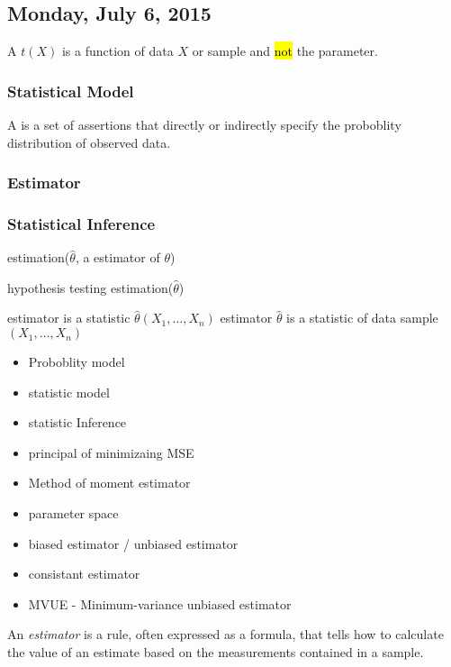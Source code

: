 \subsection{Monday, July 6, 2015}

A  $t(X)$ is a function of data $X$ or sample and \hl{not} the parameter.

\subsubsection{Statistical Model}
A  is a set of assertions that directly or indirectly specify the proboblity distribution of observed data.


\subsubsection{Estimator}



\subsubsection{Statistical Inference}
estimation($\hat \theta$, a estimator of $\theta$)

hypothesis testing estimation($\hat \theta$)


estimator is a statistic $\hat \theta(X_1,\ldots,X_n)$
estimator $\hat \theta$ is a statistic of data sample $(X_1,\ldots,X_n)$

\begin{itemize}
\item Proboblity model
\item statistic model
\item statistic Inference
\item principal of minimizaing MSE
\item Method of moment estimator
\item parameter space
\item biased estimator / unbiased estimator
\item consistant estimator
\item MVUE - Minimum-variance unbiased estimator
\end{itemize}



An \textit{estimator} is a rule, often expressed as a formula, that tells how to calculate the value of an estimate based on the measurements contained in a sample.

